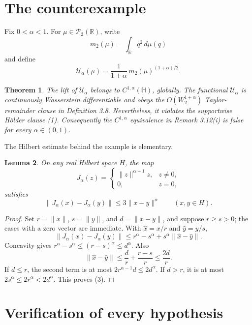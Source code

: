 \documentclass[11pt]{article}
\newtheorem{theorem}{Theorem}
\newtheorem{lemma}[theorem]{Lemma}
\newcommand{\R}{\mathbb R}
\newcommand{\Hh}{\mathbb H}
\newcommand{\Ptwo}{\mathcal P_2}
\newcommand{\Ua}{\mathcal U_\alpha}
\begin{document}
\section{The counterexample}

Fix \(0<\alpha<1\). For \(\mu\in\Ptwo(\R)\), write
\[
 m_2(\mu)=\int_{\R}q^2\,d\mu(q)
\]
and define
\begin{equation}
 \Ua(\mu)=\frac{1}{1+\alpha}\,
             m_2(\mu)^{(1+\alpha)/2}.
 \tag{2}
\end{equation}

\begin{theorem}\label{thm:main}
The lift of \(\Ua\) belongs to \(C^{1,\alpha}(\Hh)\), globally. The
functional \(\Ua\) is continuously Wasserstein differentiable and obeys
the \(O(W_2^{1+\alpha})\) Taylor-remainder clause in Definition 3.8.
Nevertheless, it violates the supportwise H\"older clause \emph{(1)}.
Consequently the \(C^{1,\alpha}\) equivalence in Remark 3.12(i) is false
for every \(\alpha\in(0,1)\).
\end{theorem}

The Hilbert estimate behind the example is elementary.

\begin{lemma}\label{lem:holder}
On any real Hilbert space \(H\), the map
\[
 J_\alpha(z)=
 \begin{cases}
 \|z\|^{\alpha-1}z,&z\ne0,\\
 0,&z=0,
 \end{cases}
\]
satisfies
\[
 \|J_\alpha(x)-J_\alpha(y)\|\le3\|x-y\|^\alpha
 \qquad(x,y\in H).
 \tag{3}
\]
\end{lemma}

\begin{proof}
Set \(r=\|x\|\), \(s=\|y\|\), and \(d=\|x-y\|\), and suppose
\(r\ge s>0\); the cases with a zero vector are immediate. With
\(\widehat x=x/r\) and \(\widehat y=y/s\),
\[
 \|J_\alpha(x)-J_\alpha(y)\|
 \le r^\alpha-s^\alpha+s^\alpha
      \|\widehat x-\widehat y\|.
\]
Concavity gives \(r^\alpha-s^\alpha\le(r-s)^\alpha\le d^\alpha\).
Also
\[
 \|\widehat x-\widehat y\|
 \le \frac d r+\frac{r-s}{r}\le\frac{2d}{r}.
\]
If \(d\le r\), the second term is at most
\(2r^{\alpha-1}d\le2d^\alpha\). If \(d>r\), it is at most
\(2s^\alpha\le2r^\alpha<2d^\alpha\). This proves (3).
\end{proof}

\section{Verification of every hypothesis}
\end{document}
